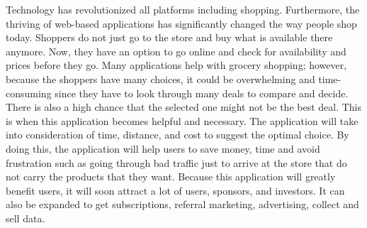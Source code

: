 Technology has revolutionized all platforms including shopping. Furthermore, the thriving of web-based applications has significantly changed the way people shop today. Shoppers do not just go to the store and buy what is available there anymore. Now, they have an option to go online and check for availability and prices before they go. Many applications help with grocery shopping; however, because the shoppers have many choices, it could be overwhelming and time-consuming since they have to look through many deals to compare and decide. There is also a high chance that the selected one might not be the best deal. This is when this application becomes helpful and necessary. The application will take into consideration of time, distance, and cost to suggest the optimal choice. By doing this, the application will help users to save money, time and avoid frustration such as going through bad traffic just to arrive at the store that do not carry the products that they want. Because this application will greatly benefit users, it will soon attract a lot of users, sponsors, and investors. It can also be expanded to get subscriptions, referral marketing, advertising, collect and sell data.